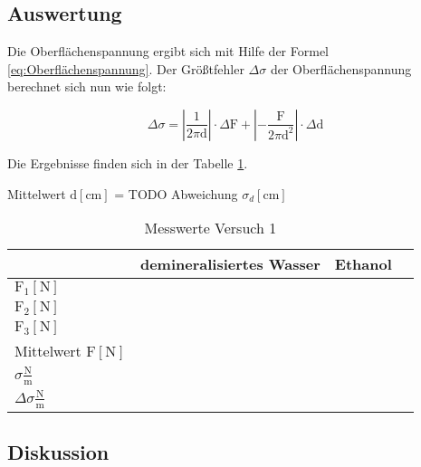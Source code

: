         \subsection{Auswertung}

            Die Oberflächenspannung ergibt sich mit Hilfe der Formel \ref{eq:Oberflächenspannung}.
            Der Größtfehler $\Delta \sigma$ der Oberflächenspannung berechnet sich nun wie folgt:

            \begin{equation}
                \Delta \sigma = \left| \frac{1}{2 \pi \mathrm{d}} \right| \cdot \Delta \mathrm{F} + \left| -\frac{\mathrm{F}}{2 \pi \mathrm{d}^2} \right| \cdot \Delta \mathrm{d} 
                \label{eq:Größtfehler}
            \end{equation}

            Die Ergebnisse finden sich in der Tabelle \ref{tab:Versuch1_Ergebnisse}.

            Mittelwert $\mathrm{d[cm]}$ = TODO
            Abweichung $\sigma_d \mathrm{[cm]}$

            \begin{table}[H]
                \centering
                \caption{Messwerte Versuch 1}
                \label{tab:Versuch1_Ergebnisse}
                \vspace*{1em}
                \begin{tabular}{|l|l|l|l|}
                    \hline
                    & demineralisiertes Wasser & Ethanol \\
                    \hline
                    $\mathrm{F_1 [N]}$ &  & \\
                    \hline
                    $\mathrm{F_2 [N]}$ & & \\
                    \hline
                    $\mathrm{F_3 [N]}$ &  & \\
                    \hline
                    Mittelwert $\mathrm{F [N]}$ & & \\
                    \hline
                    $\sigma \frac{\mathrm{N}}{\mathrm{m}}$ & & \\
                    \hline
                    $\Delta \sigma \frac{\mathrm{N}}{\mathrm{m}}$ & & \\
                    \hline
                \end{tabular}
            \end{table}
        
        \subsection{Diskussion}

